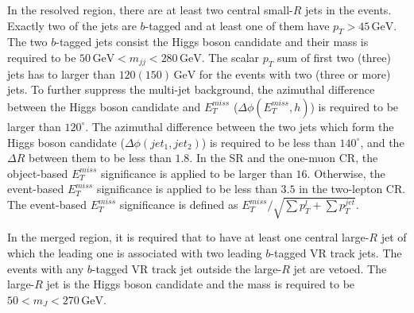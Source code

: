 \documentclass[class=NTHU_thesis, crop=false]{standalone}
\begin{document}
In the resolved region, there are at least two central small-$R$ jets in the events. Exactly two of the jets are $b$-tagged and at least one of them have $p_T > 45\, \mathrm{GeV}$. The two $b$-tagged jets consist the Higgs boson candidate and their mass is required to be $50\, \mathrm{GeV} < m_{jj} < 280\, \mathrm{GeV}$. The scalar $p_T$ sum of first two (three) jets has to larger than $120 (150)\, \mathrm{GeV}$ for the events with two (three or more) jets. To further suppress the multi-jet background, the azimuthal difference between the Higgs boson candidate and $E^{miss}_T$ ($\Delta\phi(E^{miss}_T, h)$) is required to be larger than $120^\circ$. The azimuthal difference between the two jets which form the Higgs boson candidate ($\Delta\phi(jet_1, jet_2)$) is required to be less than $140^\circ$, and the ${\Delta}R$ between them to be less than $1.8$. In the SR and the one-muon CR, the object-based $E^{miss}_T$ significance is applied to be larger than $16$. Otherwise, the event-based $E^{miss}_T$ significance is applied to be less than $3.5$ in the two-lepton CR. The event-based $E^{miss}_T$ significance is defined as $E^{miss}_T/\sqrt{{\sum}p^l_T+{\sum}p^{jet}_T}$.

In the merged region, it is required that to have at least one central large-$R$ jet of which the leading one is associated with two leading $b$-tagged VR track jets. The events with any $b$-tagged VR track jet outside the large-$R$ jet are vetoed. The large-$R$ jet is the Higgs boson candidate and the mass is required to be $50 < m_{J} < 270\, \mathrm{GeV}$.
\end{document}
